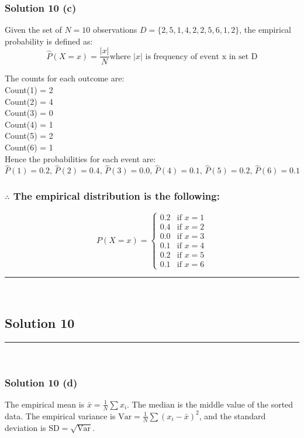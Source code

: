 \documentclass{article}
\begin{document}
\subsubsection*{Solution  10 (c)}
\parbox{\textwidth}{Given the set of $N=10$ observations $D = \{2, 5, 1, 4, 2, 2, 5, 6, 1, 2\}$, the empirical probability is defined as:
 $$\hat{P}(X=x) = \frac{|x|}{N} \text{where }|x| \text{ is frequency of event x in set D}$$ 
}
\parbox{\textwidth}{The counts for each outcome are: \\ Count(1) = 2 \\ Count(2) = 4 \\ Count(3) = 0 \\ Count(4) = 1 \\ Count(5) = 2 \\ Count(6) = 1 \\

Hence the probabilities for each event are:
$$ \hat{P}(1)=0.2 \text{, } \hat{P}(2)=0.4 \text{, } \hat{P}(3)=0.0 \text{, } \hat{P}(4)=0.1 \text{, }  \hat{P}(5)=0.2 \text{, } \hat{P}(6)=0.1$$
}

\subsubsection*{\normalfont $\therefore$ The empirical distribution is the following:}

\[
P(X=x) =
\begin{cases}
    0.2 & \text{if } x=1 \\
    0.4 & \text{if } x=2 \\
    0.0 & \text{if } x=3 \\
    0.1 & \text{if } x=4 \\
    0.2 & \text{if } x=5 \\
    0.1 & \text{if } x=6
\end{cases}
\]


\noindent\rule{\textwidth}{0.4pt}\\

\newpage

\subsection*{Solution 10}
\noindent\rule{\textwidth}{0.4pt}\\
\subsubsection*{Solution  10 (d)}
\parbox{\textwidth}{The empirical mean is $\bar{x} = \frac{1}{N}\sum x_i$. The median is the middle value of the sorted data. The empirical variance is $\text{Var} = \frac{1}{N}\sum(x_i - \bar{x})^2$, and the standard deviation is $\text{SD} = \sqrt{\text{Var}}$.}
\end{document}
